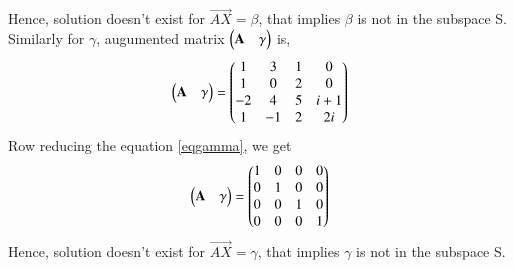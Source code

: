 \documentclass[journal,12pt,twocolumn]{IEEEtran}
\begin{document}
Hence, solution doesn't exist for $\vec{AX}=\beta$, that implies $\beta$ is not in the subspace S.\\
Similarly for $\gamma$, augumented matrix $\begin{pmatrix}\mathbf{A}&\gamma\end{pmatrix}$ is,
\begin{align}\label{eqgamma}
\begin{pmatrix}\mathbf{A}&\gamma\end{pmatrix}=\begin{pmatrix}1&3&1&0\\1&0&2&0\\-2&4&5&i+1\\1&-1&2&2i\end{pmatrix} 
\end{align}
Row reducing the equation \eqref{eqgamma}, we get
\begin{align}
\begin{pmatrix}\mathbf{A}&\gamma\end{pmatrix}= \begin{pmatrix}1&0&0&0\\0&1&0&0\\0&0&1&0\\0&0&0&1\end{pmatrix}
\end{align}
Hence, solution doesn't exist for $\vec{AX}=\gamma$, that implies $\gamma$ is not in the subspace S.
\end{document}
